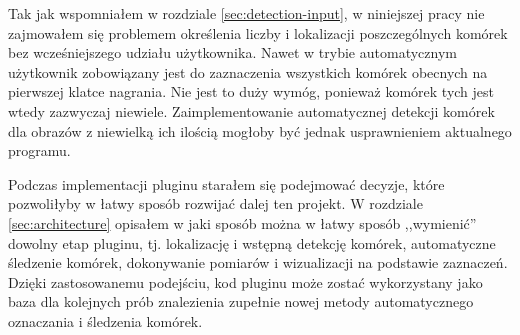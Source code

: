 \documentclass[declaration,shortabstract,mgr]{iithesis}
\begin{document}
Tak jak wspomniałem w rozdziale \ref{sec:detection-input}, w niniejszej pracy nie zajmowałem się problemem określenia liczby i lokalizacji poszczególnych komórek bez wcześniejszego udziału użytkownika.
Nawet w trybie automatycznym użytkownik zobowiązany jest do zaznaczenia wszystkich komórek obecnych na pierwszej klatce nagrania.
Nie jest to duży wymóg, ponieważ komórek tych jest wtedy zazwyczaj niewiele.
Zaimplementowanie automatycznej detekcji komórek dla obrazów z niewielką ich ilością mogłoby być jednak usprawnieniem aktualnego programu.

Podczas implementacji pluginu starałem się podejmować decyzje, które pozwoliłyby w łatwy sposób rozwijać dalej ten projekt.
W rozdziale \ref{sec:architecture} opisałem w jaki sposób można w łatwy sposób ,,wymienić'' dowolny etap pluginu, tj. lokalizację i wstępną detekcję komórek, automatyczne śledzenie komórek, dokonywanie pomiarów i wizualizacji na podstawie zaznaczeń.
Dzięki zastosowanemu podejściu, kod pluginu może zostać wykorzystany jako baza dla kolejnych prób znalezienia zupełnie nowej metody automatycznego oznaczania i śledzenia komórek.






\end{document}
